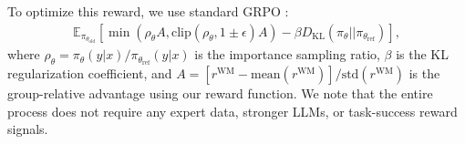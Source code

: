 \documentclass{article}
\theoremstyle{plain}
\theoremstyle{definition}
\theoremstyle{remark}
\begin{document}
To optimize this reward, we use standard GRPO \citep{shao2024deepseekmathpushinglimitsmathematical,deepseekai2025deepseekr1incentivizingreasoningcapability}:
\begin{align}
    \mathbb{E}_{\pi_{\theta_{\mathrm{old}}}} \left[ 
    \min{ \left(\rho_\theta A, \textrm{clip}(\rho_\theta, 1\pm\epsilon) A \right)} -\beta D_{\textrm{KL}}(\pi_\theta || \pi_{\theta_{\mathrm{ref}}}) \right],\nonumber
\end{align}
where $\rho_\theta = \pi_\theta(y|x) / \pi_{\theta_{\mathrm{ref}}}(y|x)$ is the importance sampling ratio, $\beta$ is the KL regularization coefficient, and $A=[r^{\mathrm{WM}}- \textrm{mean}(r^{\mathrm{WM}})] / {\textrm{std}(r^{\mathrm{WM}})}$ is the group-relative advantage using our reward function.
We note that the entire process does not require any expert data, stronger LLMs, or task-success reward signals.
\end{document}

